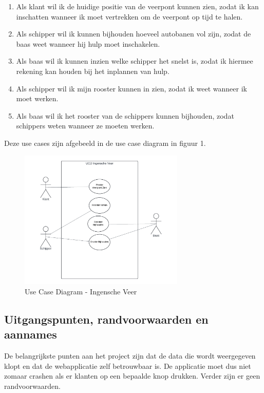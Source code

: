 \documentclass{article}
\begin{document}
\begin{tcolorbox}[colback=white, colframe=black, title=\textbf{Use Cases}]
\begin{enumerate}
    \item Als klant wil ik de huidige positie van de veerpont kunnen zien, zodat ik kan inschatten wanneer ik moet vertrekken om de veerpont op tijd te halen.
    \item Als schipper wil ik kunnen bijhouden hoeveel autobanen vol zijn, zodat de baas weet wanneer hij hulp moet inschakelen.
    \item Als baas wil ik kunnen inzien welke schipper het snelst is, zodat ik hiermee rekening kan houden bij het inplannen van hulp.
    \item Als schipper wil ik mijn rooster kunnen in zien, zodat ik weet wanneer ik moet werken.
    \item Als baas wil ik het rooster van de schippers kunnen bijhouden, zodat schippers weten wanneer ze moeten werken.
\end{enumerate}
\end{tcolorbox}
\par\smallskip
Deze use cases zijn afgebeeld in de use case diagram in figuur 1.
\begin{figure}[h]
    \centering
    \label{fig:ucd}
    \includegraphics[width=0.7\textwidth]{images/iv_ucd.png}
    \caption{Use Case Diagram - Ingensche Veer}
\end{figure}
\pagebreak

\subsection{Uitgangspunten, randvoorwaarden en aannames}
De belangrijkste punten aan het project zijn dat de data die wordt weergegeven klopt en dat de webapplicatie zelf betrouwbaar is. De applicatie moet dus niet zomaar crashen als er klanten op een bepaalde knop drukken.
Verder zijn er geen randvoorwaarden.
\end{document}
